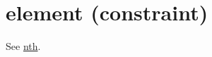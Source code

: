 \section{element (constraint)}\label{element:elementconstraint}\hypertarget{element:elementconstraint}{}
See \hyperlink{nth:nthconstraint}{nth}.
